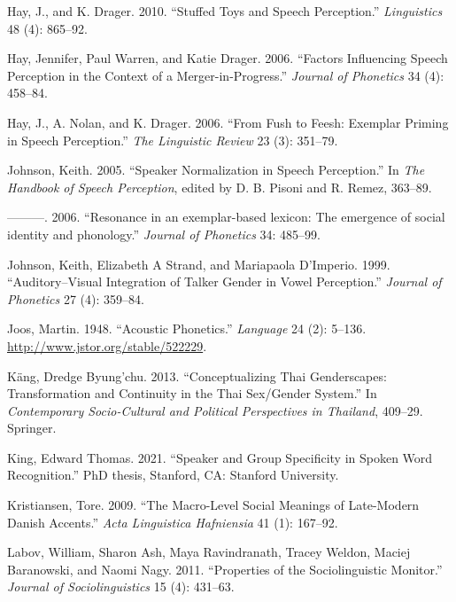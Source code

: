 \documentclass[
  letterpaper,
  DIV=11,
  numbers=noendperiod]{scrartcl}
\newlength{\cslhangindent}
\newenvironment{CSLReferences}[2] %
 {\begin{list}{}{%
  \setlength{\itemindent}{0pt}
  \setlength{\leftmargin}{0pt}
  \setlength{\parsep}{0pt}
  \ifodd #1
   \setlength{\leftmargin}{\cslhangindent}
   \setlength{\itemindent}{-1\cslhangindent}
  \fi
  \setlength{\itemsep}{#2\baselineskip}}}
 {\end{list}}
\begin{document}
\begin{CSLReferences}{1}{0}
Hay, J., and K. Drager. 2010. {``Stuffed Toys and Speech Perception.''}
\emph{Linguistics} 48 (4): 865--92.

Hay, Jennifer, Paul Warren, and Katie Drager. 2006. {``Factors
Influencing Speech Perception in the Context of a Merger-in-Progress.''}
\emph{Journal of Phonetics} 34 (4): 458--84.

Hay, J., A. Nolan, and K. Drager. 2006. {``From Fush to Feesh: Exemplar
Priming in Speech Perception.''} \emph{The Linguistic Review} 23 (3):
351--79.

Johnson, Keith. 2005. {``Speaker Normalization in Speech Perception.''}
In \emph{The Handbook of Speech Perception}, edited by D. B. Pisoni and
R. Remez, 363--89.

---------. 2006. {``{Resonance in an exemplar-based lexicon: The
emergence of social identity and phonology.}''} \emph{Journal of
Phonetics} 34: 485--99.

Johnson, Keith, Elizabeth A Strand, and Mariapaola D'Imperio. 1999.
{``Auditory--Visual Integration of Talker Gender in Vowel Perception.''}
\emph{Journal of Phonetics} 27 (4): 359--84.

Joos, Martin. 1948. {``Acoustic Phonetics.''} \emph{Language} 24 (2):
5--136. \url{http://www.jstor.org/stable/522229}.

Käng, Dredge Byung'chu. 2013. {``Conceptualizing Thai Genderscapes:
Transformation and Continuity in the Thai Sex/Gender System.''} In
\emph{Contemporary Socio-Cultural and Political Perspectives in
Thailand}, 409--29. Springer.

King, Edward Thomas. 2021. {``Speaker and Group Specificity in Spoken
Word Recognition.''} PhD thesis, Stanford, CA: Stanford University.

Kristiansen, Tore. 2009. {``The Macro-Level Social Meanings of
Late-Modern Danish Accents.''} \emph{Acta Linguistica Hafniensia} 41
(1): 167--92.

Labov, William, Sharon Ash, Maya Ravindranath, Tracey Weldon, Maciej
Baranowski, and Naomi Nagy. 2011. {``Properties of the Sociolinguistic
Monitor.''} \emph{Journal of Sociolinguistics} 15 (4): 431--63.


\end{CSLReferences}
\end{document}
